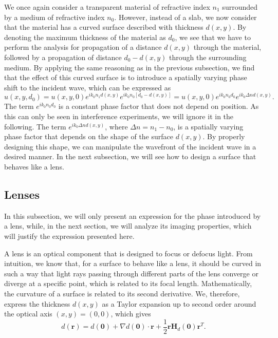 \documentclass[a4paper,10pt]{article}
\begin{document}
We once again consider a transparent material of refractive index $n_1$ surrounded by a medium of refractive index $n_0$. However, instead of a slab, we now consider that the material has a curved surface described with thickness $d(x,y)$. By denoting the maximum thickness of the material as $d_0$, we see that we have to perform the analysis for propagation of a distance $d(x,y)$ through the material, followed by a propagation of distance $d_0 - d(x,y)$ through the surrounding medium. By applying the same reasoning as in the previous subsection, we find that the effect of this curved surface is to introduce a spatially varying phase shift to the incident wave, which can be expressed as
\begin{equation}
    u(x,y,d_0) = u(x,y,0) e^{i k_0 n_1 d(x,y)} e^{i k_0 n_0 [d_0 - d(x,y)]} = u(x,y,0) e^{i k_0 n_0 d_0} e^{i k_0 \Delta n d(x,y)}.
\end{equation}
The term $e^{i k_0 n_0 d_0}$ is a constant phase factor that does not depend on position. As this can only be seen in interference experiments, we will ignore it in the following. The term $e^{i k_0 \Delta n d(x,y)}$, where $\Delta n = n_1 - n_0$, is a spatially varying phase factor that depends on the shape of the surface $d(x,y)$. By properly designing this shape, we can manipulate the wavefront of the incident wave in a desired manner. In the next subsection, we will see how to design a surface that behaves like a lens.

\subsection{Lenses}

In this subsection, we will only present an expression for the phase introduced by a lens, while, in the next section, we will analyze its imaging properties, which will justify the expression presented here. 

A lens is an optical component that is designed to focus or defocus light. From intuition, we know that, for a surface to behave like a lens, it should be curved in such a way that light rays passing through different parts of the lens converge or diverge at a specific point, which is related to its focal length. Mathematically, the curvature of a surface is related to its second derivative. We, therefore, express the thickness $d(x,y)$ as a Taylor expansion up to second order around the optical axis $(x,y) = (0,0)$, which gives
\begin{equation}
    d(\mathbf{r}) = d(\boldsymbol{0}) + \nabla d(\boldsymbol{0}) \cdot \mathbf{r} + \frac{1}{2} \mathbf{r}\mathbf{H}_d(\boldsymbol{0}) \mathbf{r}^T.
\end{equation}
\end{document}
